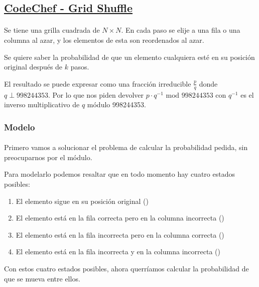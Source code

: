 \documentclass[../main.tex]{subfiles}
\begin{document}



\subsection{\href{https://www.codechef.com/ICPCIN19/problems/SHUFGRID}{CodeChef - Grid Shuffle}}

\paragraph{} Se tiene una grilla cuadrada de \(N \times N\). En cada paso se elije a una fila o una columna al azar, y los elementos de esta son reordenados al azar.

Se quiere saber la probabilidad de que un elemento cualquiera esté en su posición original después de \(k\) pasos.

El resultado se puede expresar como una fracción irreducible \(\frac{p}{q}\) donde \(q \perp 998244353\). Por lo que nos piden devolver \(p \cdot q^{-1} \text{ mod } 998244353\) con \(q^{-1}\) es el inverso multiplicativo de \(q\) módulo 998244353.

\subsubsection{Modelo}
\paragraph{} Primero vamos a solucionar el problema de calcular la probabilidad pedida, sin preocuparnos por el módulo.

Para modelarlo podemos resaltar que en todo momento hay cuatro estados posibles:
\begin{enumerate}
  \item El elemento sigue en su posición original (\Grrcc)
  \item El elemento está en la fila correcta pero en la columna incorrecta (\Grrcm)
  \item El elemento está en la fila incorrecta pero en la columna correcta (\Grmcc)
  \item El elemento está en la fila incorrecta y en la columna incorrecta (\Grmcm)
\end{enumerate}

Con estos cuatro estados posibles, ahora querríamos calcular la probabilidad de que se mueva entre ellos.
\end{document}
